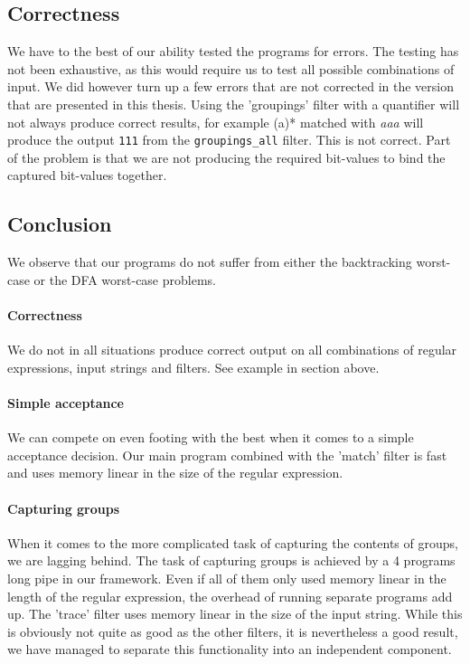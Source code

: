 \subsection{Correctness}

We have to the best of our ability tested the programs for errors. The
testing has not been exhaustive, as this would require us to test all
possible combinations of input. We did however turn up a few errors
that are not corrected in the version that are presented in this
thesis. Using the 'groupings' filter with a quantifier will not always
produce correct results, for example \textsf{(a)*} matched with
\textsl{aaa} will produce the output \texttt{111} from the
\lstinline{groupings_all} filter. This is not correct. Part of the
problem is that we are not producing the required bit-values to bind
the captured bit-values together.

\subsection{Conclusion}

We observe that our programs do not suffer from either the
backtracking worst-case or the DFA worst-case problems.

\paragraph{Correctness} We do not in all situations produce correct
output on all combinations of regular expressions, input strings and
filters. See example in section above.

\paragraph{Simple acceptance} We can compete on even footing with the
best when it comes to a simple acceptance decision. Our main program
combined with the 'match' filter is fast and uses memory linear in the
size of the regular expression.

\paragraph{Capturing groups} When it comes to the more complicated
task of capturing the contents of groups, we are lagging behind. The
task of capturing groups is achieved by a 4 programs long pipe in our
framework. Even if all of them only used memory linear in the length
of the regular expression, the overhead of running separate programs
add up.  The 'trace' filter uses memory linear in the size of the
input string. While this is obviously not quite as good as the other
filters, it is nevertheless a good result, we have managed to separate
this functionality into an independent component.

